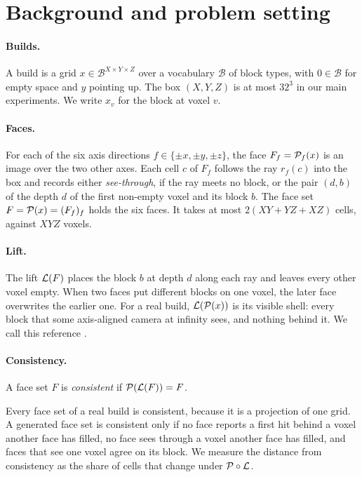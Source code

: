 \section{Background and problem setting}
\label{sec:background}

\paragraph{Builds.}
A build is a grid $x \in \mathcal{B}^{X \times Y \times Z}$ over a vocabulary $\mathcal{B}$ of block
types, with $0 \in \mathcal{B}$ for empty space and $y$ pointing up. The box $(X,Y,Z)$ is at most
$32^3$ in our main experiments. We write $x_v$ for the block at voxel $v$.

\paragraph{Faces.}
For each of the six axis directions $f \in \{\pm x, \pm y, \pm z\}$, the face $F_f = \mathcal{P}_f(x)$ is
an image over the two other axes. Each cell $c$ of $F_f$ follows the ray $r_f(c)$ into the box and
records either \emph{see-through}, if the ray meets no block, or the pair $(d, b)$ of the depth $d$
of the first non-empty voxel and its block $b$. The face set $F = \mathcal{P}(x) = (F_f)_f$ holds the six faces.
It takes at most $2(XY + YZ + XZ)$ cells, against $XYZ$ voxels.

\paragraph{Lift.}
The lift $\mathcal{L}(F)$ places the block $b$ at depth $d$ along each ray and leaves every other voxel
empty. When two faces put different blocks on one voxel, the later face overwrites the earlier one.
For a real build, $\mathcal{L}(\mathcal{P}(x))$ is its visible shell: every block that some axis-aligned camera
at infinity sees, and nothing behind it. We call this reference \shellref{}.

\paragraph{Consistency.}
\begin{definition}
A face set $F$ is \emph{consistent} if $\mathcal{P}(\mathcal{L}(F)) = F$.
\end{definition}
Every face set of a real build is consistent, because it is a projection of one grid. A generated face
set is consistent only if no face reports a first hit behind a voxel another face has filled, no face
sees through a voxel another face has filled, and faces that see one voxel agree on its block. We
measure the distance from consistency as the share of cells that change under $\mathcal{P} \circ \mathcal{L}$.

